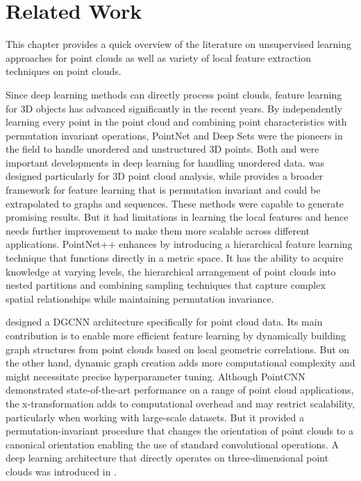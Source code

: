 \section{Related Work}
\label{sec:related_works}
This chapter provides a quick overview of the literature on unsupervised learning approaches for point clouds as well as variety of local feature extraction techniques on point clouds.

\vspace{5mm}


Since deep learning methods can directly process point clouds, feature learning for 3D objects has advanced significantly in the recent years. By independently learning every point in the point cloud and combining point characteristics with permutation invariant operations, PointNet \cite{qi2017pointnet} and Deep Sets \cite{zaheer2017deep} were the pioneers in the field to handle unordered and unstructured 3D points. Both \cite{qi2017pointnet} and \cite{zaheer2017deep} were important developments in deep learning for handling unordered data. \cite{qi2017pointnet} was designed particularly for 3D point cloud analysis, while \cite{zaheer2017deep} provides a broader framework for feature learning that is permutation invariant and could be extrapolated to graphs and sequences. These methods were capable to generate promising results. But it had limitations in learning the local features and hence needs further improvement to make them more scalable across different applications. PointNet++ \cite{qi2017pointnet++} enhances \cite{qi2017pointnet} by introducing a hierarchical feature learning technique that functions directly in a metric space. It has the ability to acquire knowledge at varying levels, the hierarchical arrangement of point clouds into nested partitions and combining sampling techniques that capture complex spatial relationships while maintaining permutation invariance. 


\vspace{5mm}

\cite{wang2019dynamic}  designed a \ac{DGCNN} architecture specifically for point cloud data. Its main contribution is to enable more efficient feature learning by dynamically building graph structures from point clouds based on local geometric correlations. But on the other hand, dynamic graph creation adds more computational complexity and might necessitate precise hyperparameter tuning. Although PointCNN \cite{li2018pointcnn} demonstrated state-of-the-art performance on a range of point cloud applications, the x-transformation adds to computational overhead and may restrict scalability, particularly when working with large-scale datasets.  But it provided a  permutation-invariant procedure that changes the orientation of point clouds to a canonical orientation enabling the use of standard convolutional operations. A deep learning architecture that directly operates on three-dimensional point clouds was introduced in \cite{wu2019deep}. 

